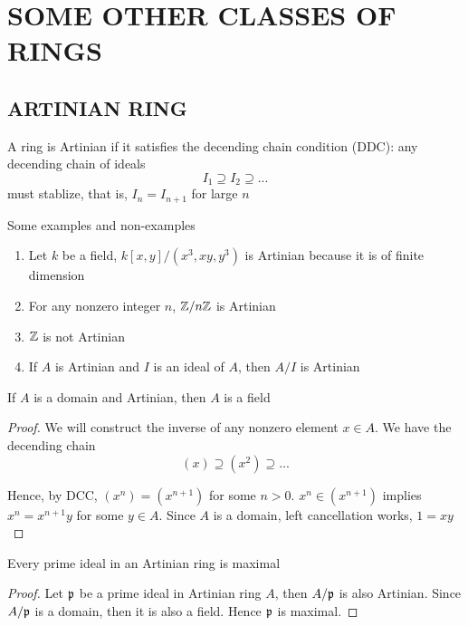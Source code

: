 \chapter{SOME OTHER CLASSES OF RINGS}

\section{ARTINIAN RING}


\begin{definition}
	A ring is Artinian if it satisfies the decending chain condition (DDC): any decending chain of ideals
	$$
		I_1 \supseteq I_2 \supseteq ...
	$$
	must stablize, that is, $I_n = I_{n + 1}$ for large $n$
\end{definition}

\begin{remark}
	Some examples and non-examples
	\begin{enumerate}
		\item Let $k$ be a field, $k[x, y] / (x^3, xy, y^3)$ is Artinian because it is of finite dimension
		\item For any nonzero integer $n$, $\mathbb{Z} / n \mathbb{Z}$ is Artinian
		\item $\mathbb{Z}$ is not Artinian
		\item If $A$ is Artinian and $I$ is an ideal of $A$, then $A / I$ is Artinian
	\end{enumerate}
\end{remark}

\begin{proposition}
	If $A$ is a domain and Artinian, then $A$ is a field
\end{proposition}

\begin{proof}
	We will construct the inverse of any nonzero element $x \in A$. We have the decending chain
	$$
		(x) \supseteq (x^2) \supseteq ...
	$$
	
	Hence, by DCC, $(x^n) = (x^{n+1})$ for some $n > 0$. $x^n \in (x^{n+1})$ implies $x^n = x^{n+1} y$ for some $y \in A$. Since $A$ is a domain, left cancellation works, $1 = xy$
\end{proof}

\begin{corollary}
	Every prime ideal in an Artinian ring is maximal
\end{corollary}

\begin{proof}
	Let $\mathfrak{p}$ be a prime ideal in Artinian ring $A$, then $A / \mathfrak{p}$ is also Artinian. Since $A / \mathfrak{p}$ is a domain, then it is also a field. Hence $\mathfrak{p}$ is maximal.
\end{proof}

